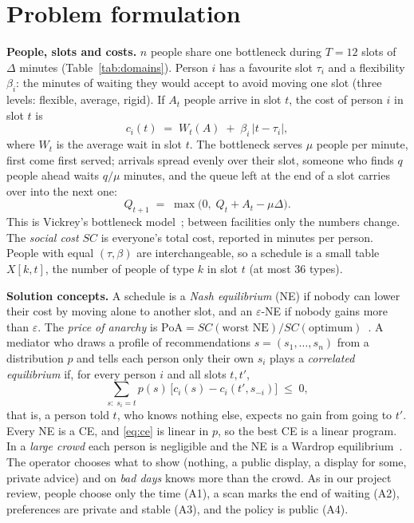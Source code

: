 \documentclass{article}
\begin{document}
\section{Problem formulation}\label{sec:model}
\textbf{People, slots and costs.} $n$ people share one bottleneck during $T=12$ slots of $\Delta$ minutes
(Table~\ref{tab:domains}). Person $i$ has a favourite slot $\tau_i$ and a flexibility $\beta_i$: the minutes of
waiting they would accept to avoid moving one slot (three levels: flexible, average, rigid). If $A_t$ people arrive
in slot $t$, the cost of person $i$ in slot $t$ is
\begin{equation}\label{eq:cost}
c_i(t) \;=\; W_t(A) \;+\; \beta_i\,|t-\tau_i| ,
\end{equation}
where $W_t$ is the average wait in slot $t$. The bottleneck serves $\mu$ people per minute, first come first served;
arrivals spread evenly over their slot, someone who finds $q$ people ahead waits $q/\mu$ minutes, and the queue left
at the end of a slot carries over into the next one:
\begin{equation}\label{eq:queue}
Q_{t+1} \;=\; \max\bigl(0,\; Q_t + A_t - \mu\Delta\bigr).
\end{equation}
This is Vickrey's bottleneck model~\cite{vickrey}; between facilities only the numbers change. The \emph{social cost}
$SC$ is everyone's total cost, reported in minutes per person. People with equal $(\tau,\beta)$ are interchangeable,
so a schedule is a small table $X[k,t]$, the number of people of type $k$ in slot $t$ (at most 36 types).

\textbf{Solution concepts.} A schedule is a \emph{Nash equilibrium} (NE) if nobody can lower their cost by moving
alone to another slot, and an $\varepsilon$-NE if nobody gains more than $\varepsilon$. The \emph{price of anarchy}
is $\mathrm{PoA}=SC(\text{worst NE})/SC(\text{optimum})$~\cite{koutsoupias,roughgarden}. A mediator who draws a
profile of recommendations $s=(s_1,\dots,s_n)$ from a distribution $p$ and tells each person only their own $s_i$
plays a \emph{correlated equilibrium} if, for every person $i$ and all slots $t,t'$,
\begin{equation}\label{eq:ce}
\sum_{s:\;s_i=t} p(s)\,\bigl[c_i(s)-c_i(t',s_{-i})\bigr] \;\le\; 0 ,
\end{equation}
that is, a person told $t$, who knows nothing else, expects no gain from going to $t'$. Every NE is a CE, and
\eqref{eq:ce} is linear in $p$, so the best CE is a linear program. In a \emph{large crowd} each person is negligible
and the NE is a Wardrop equilibrium~\cite{wardrop}. The operator chooses what to show (nothing, a public display, a
display for some, private advice) and on \emph{bad days} knows more than the crowd. As in our project review, people
choose only the time (A1), a scan marks the end of waiting (A2), preferences are private and stable (A3), and the
policy is public (A4).
\end{document}
